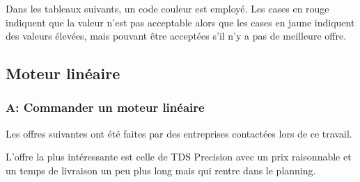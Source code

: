 Dans les tableaux suivants, un code couleur est employé. Les cases en rouge indiquent que la valeur n'est pas acceptable alors que les cases en jaune indiquent des valeurs élevées, mais pouvant être
acceptées s'il n'y a pas de meilleure offre.

\subsection{Moteur linéaire}
\subsubsection{A: Commander un moteur linéaire}
Les offres suivantes ont été faites par des entreprises contactées lors de ce travail.

\begin{table}[H]
    \centering
    \caption{Offres pour le moteur linéaire}
    \label{tab:OffreMot}
\end{table}

L'offre la plus intéressante est celle de TDS Precision \cite{TDSPrecisionProducts} avec un prix raisonnable et un temps de livraison un peu plus long mais qui rentre dans le planning.

